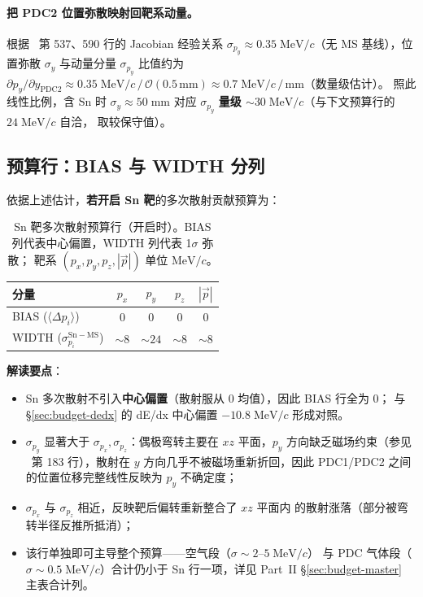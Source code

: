 \paragraph{把 PDC2 位置弥散映射回靶系动量。}
根据 \StatusReport{}~第 537、590 行的 Jacobian 经验关系
$\sigma_{p_y} \approx 0.35\;\mathrm{MeV}/c$（无 MS 基线），位置弥散
$\sigma_y$ 与动量分量 $\sigma_{p_y}$ 比值约为
$\partial p_y/\partial y_\mathrm{PDC2} \approx 0.35\;\mathrm{MeV}/c \,/\, \mathcal{O}(0.5\,\mathrm{mm})
\approx 0.7\;\mathrm{MeV}/c\,/\,\mathrm{mm}$（数量级估计）。
照此线性比例，含 Sn 时 $\sigma_y \approx 50\;\mathrm{mm}$ 对应 $\sigma_{p_y}$
\textbf{量级 $\sim 30\;\mathrm{MeV}/c$}（与下文预算行的 $24\;\mathrm{MeV}/c$ 自洽，
取较保守值）。


\subsection{预算行：BIAS 与 WIDTH 分列}
\label{sec:budget-sn-ms-row}

依据上述估计，\textbf{若开启 Sn 靶}的多次散射贡献预算为：

\begin{table}[H]
  \centering
  \caption{Sn 靶多次散射预算行（开启时）。BIAS 列代表中心偏置，WIDTH 列代表 1$\sigma$ 弥散；
           靶系 $(p_x,p_y,p_z,|\vec p|)$ 单位 $\mathrm{MeV}/c$。}
  \label{tab:sn-ms-budget}
  \begin{tabular}{lcccc}
    \toprule
    分量 & $p_x$ & $p_y$ & $p_z$ & $|\vec p|$ \\
    \midrule
    BIAS  ($\langle \Delta p_i\rangle$)
          & $0$    & $0$    & $0$    & $0$ \\
    WIDTH ($\sigma_{p_i}^{\mathrm{Sn-MS}}$)
          & $\sim 8$ & $\sim 24$ & $\sim 8$ & $\sim 8$ \\
    \bottomrule
  \end{tabular}
\end{table}

\textbf{解读要点}：
\begin{itemize}
  \item Sn 多次散射不引入\textbf{中心偏置}（散射服从 0 均值），因此 BIAS 行全为 $0$；
        与 §\ref{sec:budget-dedx} 的 dE/dx 中心偏置 $-10.8\;\mathrm{MeV}/c$ 形成对照。
  \item $\sigma_{p_y}$ 显著大于 $\sigma_{p_x}, \sigma_{p_z}$：偶极弯转主要在 $xz$
        平面，$p_y$ 方向缺乏磁场约束（参见 \StatusReport{}~第 183 行），散射在 $y$
        方向几乎不被磁场重新折回，因此 PDC1/PDC2 之间的位置位移完整线性反映为
        $p_y$ 不确定度；
  \item $\sigma_{p_x}$ 与 $\sigma_{p_z}$ 相近，反映靶后偏转重新整合了 $xz$ 平面内
        的散射涨落（部分被弯转半径反推所抵消）；
  \item 该行单独即可主导整个预算——空气段（$\sigma \sim 2\text{--}5\;\mathrm{MeV}/c$）
        与 PDC 气体段（$\sigma \sim 0.5\;\mathrm{MeV}/c$）合计仍小于 Sn 行一项，详见
        Part~II §\ref{sec:budget-master} 主表合计列。
\end{itemize}

